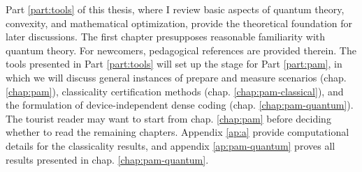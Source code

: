 
Part \ref{part:tools} of this thesis, where I review basic aspects of quantum theory, convexity, and mathematical optimization, provide the theoretical foundation for later discussions. The first chapter presupposes reasonable familiarity with quantum theory. For newcomers, pedagogical references are provided therein. The tools presented in Part \ref{part:tools} will set up the stage for Part \ref{part:pam}, in which we will discuss general instances of prepare and measure scenarios (chap. \ref{chap:pam}), classicality certification methods (chap. \ref{chap:pam-classical}), and the formulation of device-independent dense coding (chap. \ref{chap:pam-quantum}). The tourist reader may want to start from chap. \ref{chap:pam} before deciding whether to read the remaining chapters. Appendix \ref{ap:a} provide computational details for the classicality results, and appendix \ref{ap:pam-quantum} proves all results presented in chap. \ref{chap:pam-quantum}.